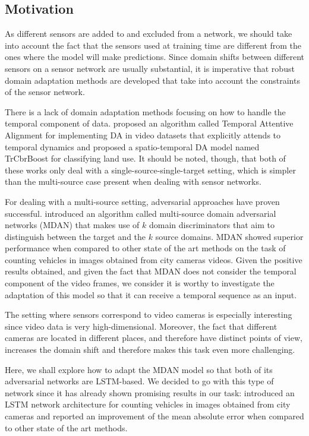 \subsection{Motivation}
As different sensors are added to and excluded from a network, we should take into account the fact that the sensors used at training time are different from the ones where the model will make predictions. Since domain shifts between different sensors on a sensor network are usually substantial, it is imperative that robust domain adaptation methods are developed that take into account the constraints of the sensor network.

There is a lack of domain adaptation methods focusing on how to handle the temporal component of data. \citet{Chen2019} proposed an algorithm called Temporal Attentive Alignment for implementing DA in video datasets that explicitly attends to temporal dynamics and \citet{Liu2014} proposed a spatio-temporal DA model named TrCbrBoost for classifying land use. It should be noted, though, that both of these works only deal with a single-source-single-target setting, which is simpler than the multi-source case present when dealing with sensor networks.

For dealing with a multi-source setting, adversarial approaches have proven successful. \citet{Zhao2018} introduced an algorithm called multi-source domain adversarial networks (MDAN) that makes use of $k$ domain discriminators that aim to distinguish between the target and the $k$ source domains. MDAN showed superior performance when compared to other state of the art methods on the task of counting vehicles in images obtained from city cameras videos. Given the positive results obtained, and given the fact that MDAN does not consider the temporal component of the video frames, we consider it is worthy to investigate the adaptation of this model so that it can receive a temporal sequence as an input.

The setting where sensors correspond to video cameras is especially interesting since video data is very high-dimensional. Moreover, the fact that different cameras are located in different places, and therefore have distinct points of view, increases the domain shift and therefore makes this task even more challenging.

Here, we shall explore how to adapt the MDAN model so that both of its adversarial networks are LSTM-based. We decided to go with this type of network since it has already shown promising results in our task: \citet{Zhang2017} introduced an LSTM network architecture for counting vehicles in images obtained from city cameras and reported an improvement of the mean absolute error when compared to other state of the art methods.

